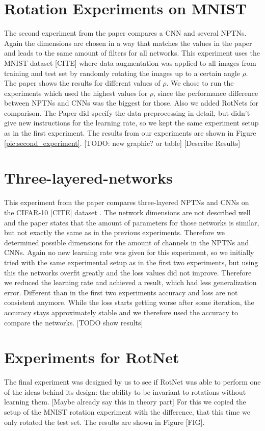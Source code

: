\documentclass{llncs}
\begin{document}
\section{Rotation Experiments on MNIST}
The second experiment from the paper compares a CNN and several NPTNs. Again the dimensions are chosen in a way that matches the values in the paper and leads to the same amount of filters for all networks. 
This experiment uses the MNIST dataset [CITE] where data augmentation was applied to all images from training and test set by randomly rotating the images up to a certain angle $\rho$. 
The paper shows the results for different values of $\rho$. We chose to run the experiments which used the highest values for $\rho$, since the performance difference between NPTNs and CNNs was the biggest for those. Also we added RotNets for comparison.
The Paper did specify the data preprocessing in detail, but didn't give new instructions for the learning rate, so we kept the same experiment setup as in the first experiment.
The results from our experiments are shown in Figure \ref{pic:second_experiment}. [TODO: new graphic? or table]
[Describe Results]

\section{Three-layered-networks}
This experiment from the paper compares three-layered NPTNs and CNNs on the CIFAR-10 [CITE] dataset . 
The network dimensions are not described well and the paper states that the amount of parameters for those networks is similar, but not exactly the same as in the previous experiments. 
Therefore we determined possible dimensions for the amount of channels in the NPTNs and CNNs. 
Again no new learning rate was given for this experiment, so we initially tried with the same experimental setup as in the first two experiments, but using this the networks overfit greatly and the loss values did not improve. 
Therefore we reduced the learning rate and achieved a result, which had less generalization error. 
Different than in the first two experiments accuracy and loss are not consistent anymore. While the loss starts getting worse after some iteration, the accuracy stays approximately stable and we therefore used the accuracy to compare the networks.
[TODO show results]

\section{Experiments for RotNet}
The final experiment was designed by us to see if RotNet was able to perform one of the ideas behind its design: the ability to be invariant to rotations without learning them. [Maybe already say this in theory part] For this we copied the setup of the MNIST rotation experiment with the difference, that this time we only rotated the test set. The results are shown in Figure [FIG]. 
\end{document}
